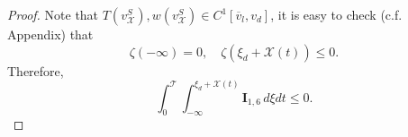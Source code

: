 \documentclass[12pt,reqno]{amsart}
\numberwithin{equation}{section}
\def\p{\partial}
\def\T{\mathcal{T}}
\def\phh{\hat{\mathbf{\Phi}}}
\def\whh{\hat{\mathbf{W}}}
\def\ah{\hat{a}}
\def\th{\hat{T}}
\def\wh{\hat{w}}
\def\vsx{v^S_{\mathcal{X}}}
\def\avl{\overline{v}_l}
\def\X{\mathcal{X}}
\begin{document}
\begin{proof}
	Note that $T(\vsx),w(\vsx) \in C^1[\avl,v_d]$, it is easy to check (c.f. Appendix) that
	\begin{equation}\label{interact2}
		\zeta(-\infty)=0,\quad \zeta(\xi_d+\X(t))\leq 0.
	\end{equation}
	Therefore, 
	\begin{equation}\label{flux-term2}
		\int_{0}^{\T}\int_{-\infty}^{\xi_{d}+\X(t)}\textbf{I}_{1,6}\,d\xi dt\leq 0.
	\end{equation}
%	

\end{proof}
\end{document}

